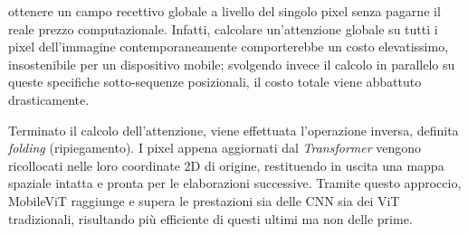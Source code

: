 ottenere un campo recettivo globale a livello del singolo pixel senza pagarne il
reale prezzo computazionale. Infatti, calcolare un'attenzione globale su tutti
i pixel dell'immagine contemporaneamente comporterebbe un costo elevatissimo, insostenibile per un dispositivo mobile; svolgendo invece il calcolo in parallelo su
queste specifiche sotto-sequenze posizionali, il costo totale viene abbattuto
drasticamente. \par
Terminato il calcolo dell'attenzione, viene effettuata l'operazione inversa,
definita \textit{folding} (ripiegamento). I pixel appena aggiornati dal
\textit{Transformer} vengono ricollocati nelle loro coordinate 2D di origine,
restituendo in uscita una mappa spaziale intatta e pronta per le elaborazioni
successive. Tramite questo approccio, MobileViT raggiunge e supera le
prestazioni sia delle CNN sia dei ViT tradizionali, risultando più efficiente
di questi ultimi ma non delle prime.
